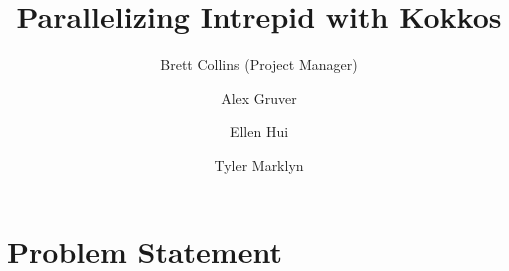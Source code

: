 \documentclass[proposal]{hmcclinic}
\title{Parallelizing Intrepid with Kokkos}
\author{Brett Collins (Project Manager) \and Alex Gruver \and Ellen Hui \and
Tyler Marklyn}
\begin{document}

\maketitle








\section{Problem Statement}
\end{document}
